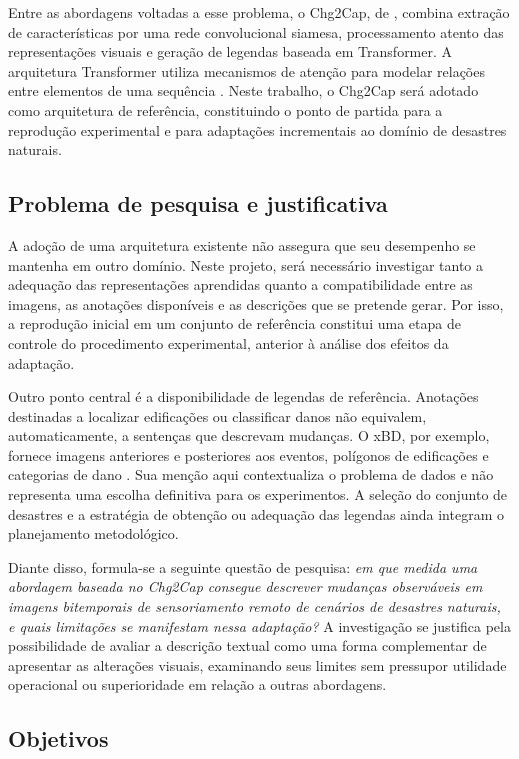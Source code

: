 Entre as abordagens voltadas a esse problema, o Chg2Cap, de \citet{chang2023}, combina extração de características por uma rede convolucional siamesa, processamento atento das representações visuais e geração de legendas baseada em Transformer. A arquitetura Transformer utiliza mecanismos de atenção para modelar relações entre elementos de uma sequência \citep{vaswani2017}. Neste trabalho, o Chg2Cap será adotado como arquitetura de referência, constituindo o ponto de partida para a reprodução experimental e para adaptações incrementais ao domínio de desastres naturais.

\subsection{Problema de pesquisa e justificativa}

A adoção de uma arquitetura existente não assegura que seu desempenho se mantenha em outro domínio. Neste projeto, será necessário investigar tanto a adequação das representações aprendidas quanto a compatibilidade entre as imagens, as anotações disponíveis e as descrições que se pretende gerar. Por isso, a reprodução inicial em um conjunto de referência constitui uma etapa de controle do procedimento experimental, anterior à análise dos efeitos da adaptação.

Outro ponto central é a disponibilidade de legendas de referência. Anotações destinadas a localizar edificações ou classificar danos não equivalem, automaticamente, a sentenças que descrevam mudanças. O xBD, por exemplo, fornece imagens anteriores e posteriores aos eventos, polígonos de edificações e categorias de dano \citep{gupta2019xbd}. Sua menção aqui contextualiza o problema de dados e não representa uma escolha definitiva para os experimentos. A seleção do conjunto de desastres e a estratégia de obtenção ou adequação das legendas ainda integram o planejamento metodológico.

Diante disso, formula-se a seguinte questão de pesquisa: \textit{em que medida uma abordagem baseada no Chg2Cap consegue descrever mudanças observáveis em imagens bitemporais de sensoriamento remoto de cenários de desastres naturais, e quais limitações se manifestam nessa adaptação?} A investigação se justifica pela possibilidade de avaliar a descrição textual como uma forma complementar de apresentar as alterações visuais, examinando seus limites sem pressupor utilidade operacional ou superioridade em relação a outras abordagens.

\subsection{Objetivos}

